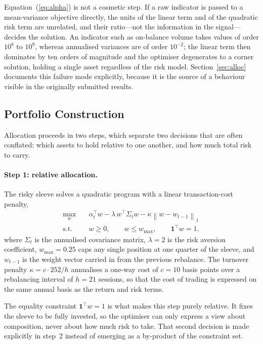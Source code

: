 \documentclass{singlecol-new}
\theoremstyle{TH}{
\newtheorem{lemma}{Lemma}
\newtheorem{theorem}[lemma]{Theorem}
\newtheorem{corrolary}[lemma]{Corrolary}
\newtheorem{conjecture}[lemma]{Conjecture}
\newtheorem{proposition}[lemma]{Proposition}
\newtheorem{claim}[lemma]{Claim}
\newtheorem{stheorem}[lemma]{Wrong Theorem}
\newtheorem{algorithm}{Algorithm}
}
\theoremstyle{THrm}{
\newtheorem{definition}{Definition}[section]
\newtheorem{question}{Question}[section]
\newtheorem{remark}{Remark}
\newtheorem{scheme}{Scheme}
}
\theoremstyle{THhit}{
\newtheorem{case}{Case}[section]
}
\begin{document}
Equation~(\ref{eq:alpha}) is not a cosmetic step. If a raw indicator is passed to a
mean-variance objective directly, the units of the linear term and of the quadratic
risk term are unrelated, and their ratio---not the information in the signal---decides
the solution. An indicator such as on-balance volume takes values of order $10^{8}$ to
$10^{9}$, whereas annualised variances are of order $10^{-2}$; the linear term then
dominates by ten orders of magnitude and the optimiser degenerates to a corner
solution, holding a single asset regardless of the risk model. Section~\ref{sec:alloc}
documents this failure mode explicitly, because it is the source of a behaviour visible
in the originally submitted results.

\subsection{Portfolio Construction}

Allocation proceeds in two steps, which separate two decisions that are often conflated:
which assets to hold relative to one another, and how much total risk to carry.

\paragraph{Step 1: relative allocation.} The risky sleeve solves a quadratic program
with a linear transaction-cost penalty,
\begin{align}
\max_{w} \quad & \alpha_t^{\top} w - \lambda \, w^{\top} \Sigma_t w
- \kappa \left\| w - w_{t-1} \right\|_1 \\
\text{s.t.} \quad & w \geq 0, \qquad w \leq w_{\max}, \qquad \mathbf{1}^{\top} w = 1,
\end{align}
where $\Sigma_t$ is the annualised covariance matrix, $\lambda = 2$ is the risk
aversion coefficient, $w_{\max} = 0.25$ caps any single position at one quarter of the
sleeve, and $w_{t-1}$ is the weight vector carried in from the previous rebalance. The
turnover penalty $\kappa = c \cdot 252 / h$ annualises a one-way cost of $c = 10$ basis
points over a rebalancing interval of $h = 21$ sessions, so that the cost of trading is
expressed on the same annual basis as the return and risk terms.

The equality constraint $\mathbf{1}^{\top} w = 1$ is what makes this step purely
relative. It fixes the sleeve to be fully invested, so the optimiser can only express a
view about composition, never about how much risk to take. That second decision is made
explicitly in step~2 instead of emerging as a by-product of the constraint set.
\end{document}
